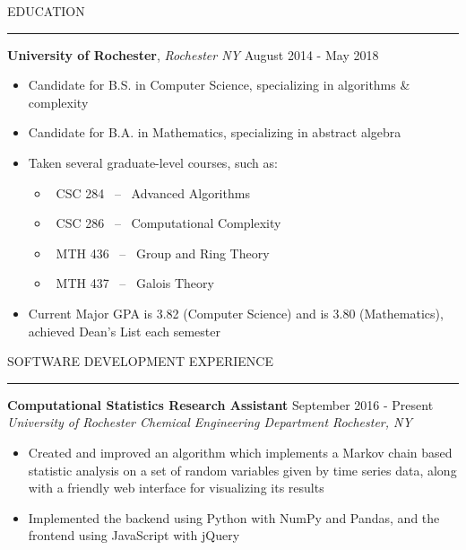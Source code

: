 \documentclass{report}
\begin{document}

\vspace*{-14pt}
{ } 
\hfill 
{} \vspace*{-5pt}

\vspace{8pt} EDUCATION
\vspace{4pt} \textcolor{gray}{\hrule}
\vspace{14pt} \textbf{University of Rochester}, \textit{Rochester NY} \hfill August 2014 - May 2018
\begin{itemize} [noitemsep,topsep=4pt]
	\item Candidate for B.S. in Computer Science, specializing in algorithms \& complexity
	\item Candidate for B.A. in Mathematics, specializing in abstract algebra
	\item Taken several graduate-level courses, such as: \begin{multicols}{2} \begin{itemize}[noitemsep, topsep=0pt]
		\item[\textbullet] ~CSC 284 ~--~ Advanced Algorithms
		\item[\textbullet] ~CSC 286 ~--~ Computational Complexity
		\item[\textbullet] ~MTH 436 ~--~ Group and Ring Theory
		\item[\textbullet] ~MTH 437 ~--~ Galois Theory
		\end{itemize} \end{multicols}
	\item Current Major GPA is 3.82 (Computer Science) and is 3.80 (Mathematics), achieved Dean's List each semester
\end{itemize}

\vspace{8pt} SOFTWARE DEVELOPMENT EXPERIENCE
\vspace{4pt} \textcolor{gray}{\hrule}

\vspace{14pt} \textbf{Computational Statistics Research Assistant} \hfill September 2016 - Present \\
\textit{University of Rochester Chemical Engineering Department \hfill Rochester, NY}
\begin{itemize} [noitemsep,topsep=4pt]
	\item Created and improved an algorithm which implements a Markov chain based statistic analysis on a set of random variables given by time series data, along with a friendly web interface for visualizing its results
	\item Implemented the backend using Python with NumPy and Pandas, and the frontend using JavaScript with jQuery
\end{itemize}
\end{document}
